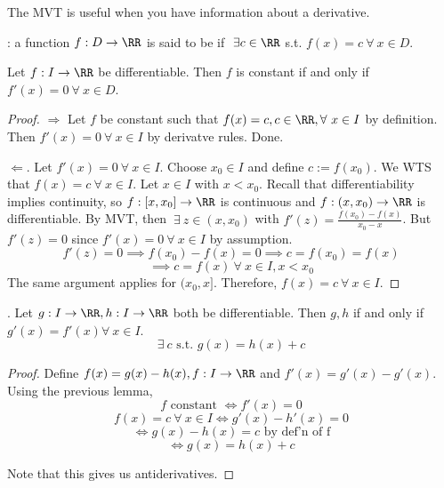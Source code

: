 \documentclass[12pt]{scrartcl}
\begin{document}
\begin{remark}
  The MVT is useful when you have information about a derivative. 
\end{remark}

\begin{definition}
  : a function $f: D \to \RR$ is said to be 
   if $\ \exists c \in \RR$ s.t. $f(x) = c \ \forall \ x \in D$.  
\end{definition}

\begin{lemma}
  Let $f: I \to \RR$ be differentiable. Then $f$ is constant if and only if 
  $f'(x) = 0 \ \forall \ x \in D$. 
  \begin{proof}
    
    \hfill

    $\Longrightarrow$ Let $f$ be constant such that $f(x) = c, c \in \RR, \forall \ x \in I$ by definition. 
    Then $f'(x) = 0 \ \forall \ x \in I$ by derivatve rules. Done. 

    $\Longleftarrow$. Let $f'(x) = 0 \ \forall \ x \in I$. Choose 
    $x_0 \in I$ and define $c := f(x_0)$. We WTS that $f(x) = c \ \forall \ x \in I$. 
    Let $x \in I$ with $x < x_0$. Recall that differentiability implies continuity, so 
    $f: [x, x_0] \to \RR$ is continuous and $f: (x, x_0) \to \RR$ is differentiable. 
    By MVT, then $\ \exists \ z \in (x, x_0)$ with $f'(z) = \frac{f(x_0) - f(x)}{x_0 - x}$. But 
    $f'(z) = 0$ since $f'(x)=0 \ \forall \ x \in I$ by assumption. 
    \[f'(z) = 0 \implies f(x_0) - f(x) = 0 \implies c = f(x_0) = f(x)\]
    \[\implies c = f(x) \ \forall \ x \in I, x < x_0\]
    The same argument applies for $(x_0, x]$. Therefore, 
    $f(x) = c \ \forall \ x \in I$.
  \end{proof}
\end{lemma}

\begin{definition}
  . Let $g: I \to \RR, h: I \to \RR$ 
  both be differentiable. Then $g, h$  if and only if 
  $g'(x) = f'(x) \forall \ x \in I$. 
  \[\exists \ c \text{ s.t. } g(x) = h(x) + c\]

  \begin{proof}
    Define $f(x) = g(x) - h(x), f: I \to \RR$ and $f'(x) = g'(x) - g'(x)$. 
    Using the previous lemma, 
    \[f \text{ constant } \Longleftrightarrow f'(x) = 0\]
    \[f(x) = c \ \forall \ x \in I \Longleftrightarrow g'(x) - h'(x) = 0\]
    \[\Longleftrightarrow g(x) - h(x) = c \text{ by def'n of f}\]
    \[\Longleftrightarrow g(x) = h(x) + c\]

    Note that this gives us antiderivatives.
  \end{proof}
\end{definition}
\end{document}
